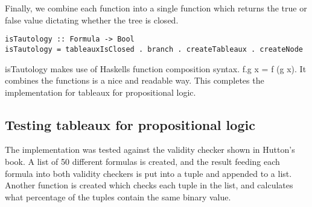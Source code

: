 \documentclass{article}%
\begin{document}
Finally, we combine each function into a single function which returns the true or false value dictating whether the tree is closed.
\begin{verbatim}
isTautology :: Formula -> Bool 
isTautology = tableauxIsClosed . branch . createTableaux . createNode
\end{verbatim}
 isTautology makes use of Haskells function composition syntax. f.g x = f (g x). It combines the functions is a nice and readable way. This completes the implementation for tableaux for propositional logic. 
\subsection{Testing tableaux for propositional logic}
The implementation was tested against the validity checker shown in Hutton's book. A list of 50 different formulas is created, and the result feeding each formula into both validity checkers is put into a tuple and appended to a list. Another function is created which checks each tuple in the list, and calculates what percentage of the tuples contain the same binary value. 
\end{document}
